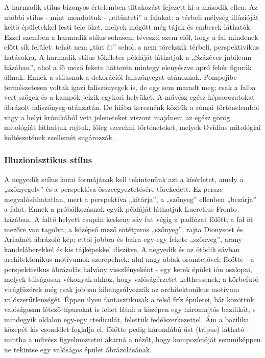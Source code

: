 A harmadik stílus bizonyos értelemben tiltakozást fejezett ki a második ellen. Az utóbbi
stílus - mint mondottuk - „eltűnteti” a falakat: a térbeli mélység illúzióját keltő
épületekkel festi tele őket, melyek mögött még tájak és emberek láthatók. Ezzel szemben
a harmadik stílus sohasem téveszti szem elől, hogy a fal mindenek előtt sík felület: tehát
nem „töri át” sehol, s nem törekszik térbeli, perspektivikus hatásokra. A harmadik stílus
tökéletes példáját láthatjuk a „Százéves jubileum házában”, ahol a fő mező fekete
hátterén mintegy elenyészve apró fehér figurák állnak. Ennek a stílusnak a dekorációi
faliszőnyeget utánoznak.
Pompejibe természetesen voltak igazi faliszőnyegek is, de egy sem maradt meg; csak a
falba vert szögek és a kampók jelzik egykori helyüket. A művész egész képsorozatokat
ábrázolt faliszőnyeg-utánzatán. De hiába keresnénk köztük a római történelemből vagy a
helyi krónikából vett jeleneteket viszont majdnem az egész görög mitológiát láthatjuk
rajtuk, főleg szerelmi történeteket, melyek Ovidius mitológiai költészetének szellemét
sugározzák. 

\subsubsection{ Illuzionisztikus stílus}

A negyedik stílus korai formájának kell tekintenünk azt a kísérletet, amely a „szőnyegelv” és a perspektíva összeegyeztetésére törekedett. Ez persze megvalósíthatatlan, mert a
perspektíva „kitárja”, a „szőnyeg” ellenben „bezárja” a falat. Ennek a próbálkozásnak
egyik példáját láthatjuk Lucretius Fronto házában. A faltő helyett csupán keskeny sáv fut
végig a padlózat fölött; a fal öt mezőre van tagolva; a középső mező sötétpiros „szőnyeg”, rajta Dionysost és Ariadnét ábrázoló kép; ettől jobbra és balra egy-egy fekete „szőnyeg”, arany kandeláberekkel és kis tájképekkel díszítve.
A negyedik és az ötödik sávban architektonikus motívumok szerepelnek: alul nagy ablak
oromtetővel; fölötte - a perspektivikus ábrázolás halvány visszfényeként - egy kerek
épület ión oszlopai, melyek túlságosan vékonyak ahhoz, hogy valóságérzetet
kelthessenek; a körbefutó virágfüzérek még csak jobban kihangsúlyozzák az
architektonikus motívum valószerűtlenségét. Éppen ilyen fantasztikusak a felső fríz
épületei, bár közöttük valóságosan létező típusokat is lehet látni: a középen egy
háromajtós bazilikát, s mindegyik oldalon egy-egy ctediculát, felettük fedélszerkezettel.
Ám a bazilika közepét kis csendélet foglalja el, fölötte pedig háromlábú üst (tripus)
látható - mintha a művész figyelmeztetni akarná a nézőt, hogy kompozícióját
semmiképpen ne tekintse egy valóságos épület ábrázolásának.

